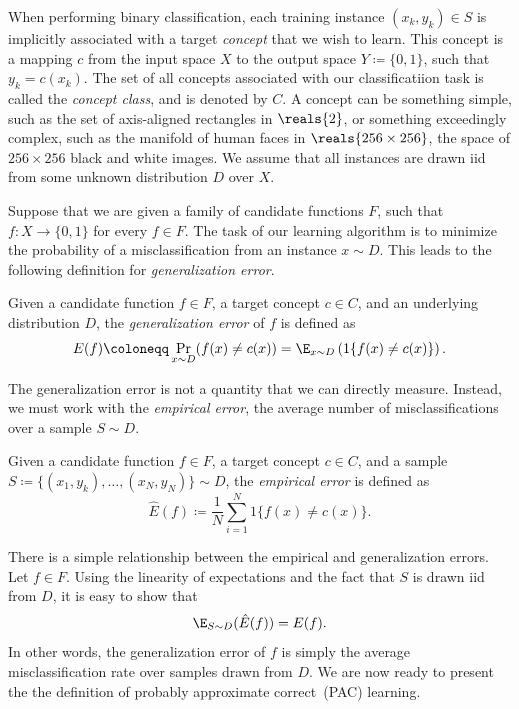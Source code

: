 \documentclass[11pt,a4paper]{article}
\numberwithin{equation}{section}
\newcommand{\ind}[1]{1\{#1\}}
\begin{document}
When performing binary classification, each training instance $(x_k, y_k) \in S$
is implicitly associated with a target \emph{concept} that we wish to learn.
This concept is a mapping $c$ from the input space $X$ to the output space $Y
\coloneqq \{0, 1\}$, such that $y_k = c(x_k)$. The set of all concepts
associated with our classificatiion task is called the \emph{concept class}, and
is denoted by $C$. A concept can be something simple, such as the set of
axis-aligned rectangles in $\reals{2}$, or something exceedingly complex, such
as the manifold of human faces in $\reals{256 \times 256}$, the space of $256
\times 256$ black and white images. We assume that all instances are drawn iid
from some unknown distribution $D$ over $X$.

Suppose that we are given a family of candidate functions $F$, such that $f : X
\to \{0, 1\}$ for every $f \in F$. The task of our learning algorithm is to
minimize the probability of a misclassification from an instance $x \sim D$.
This leads to the following definition for \emph{generalization error}.

\begin{definition}
Given a candidate function $f \in F$, a target concept $c \in C$, and an
underlying distribution $D$, the \emph{generalization error} of $f$ is defined
as
\[
	E(f) \coloneqq \Pr_{x \sim D}(f(x) \neq c(x)) =
		\E_{x \sim D} \left(\ind{f(x) \neq c(x)}\right).
\]
\end{definition}

The generalization error is not a quantity that we can directly measure.
Instead, we must work with the \emph{empirical error}, the average number of
misclassifications over a sample $S \sim D$.

\begin{definition}
Given a candidate function $f \in F$, a target concept $c \in C$, and a sample
$S \coloneqq \{(x_1, y_k), \ldots, (x_N, y_N)\} \sim D$, the \emph{empirical
error} is defined as
\[
	\hat{E}(f) \coloneqq \frac{1}{N} \sum_{i = 1}^N \ind{f(x) \neq c(x)}.
\]
\end{definition}

There is a simple relationship between the empirical and generalization errors.
Let $f \in F$.  Using the linearity of expectations and the fact that $S$ is
drawn iid from $D$, it is easy to show that
\[
	\E_{S \sim D} (\hat{E}(f)) = E(f).
\]
In other words, the generalization error of $f$ is simply the average
misclassification rate over samples drawn from $D$. We are now ready to present
the the definition of probably approximate correct~(PAC) learning.
\end{document}
